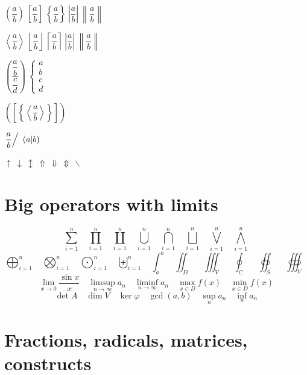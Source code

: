 \documentclass{article}
\begin{document}
$\left( \dfrac{a}{b} \right)\ \left[ \dfrac{a}{b} \right]\ \left\{ \dfrac{a}{b} \right\}\ \left| \dfrac{a}{b} \right|\ \left\| \dfrac{a}{b} \right\|$\par
$\left\langle \dfrac{a}{b} \right\rangle\ \left\lfloor \dfrac{a}{b} \right\rfloor\ \left\lceil \dfrac{a}{b} \right\rceil\ \left\lvert \dfrac{a}{b} \right\rvert\ \left\lVert \dfrac{a}{b} \right\rVert$\par
$\left( \dfrac{\dfrac{a}{b}}{\dfrac{c}{d}} \right)\ \left\{ \begin{array}{c} a \\ b \\ c \\ d \end{array} \right.$\par
$\left( \left[ \left\{ \left\langle \dfrac{a}{b} \right\rangle \right\} \right] \right)$\par
$\left. \dfrac{a}{b} \right/\ \left( a \middle| b \right)$\par
$\uparrow\ \downarrow\ \updownarrow\ \Uparrow\ \Downarrow\ \Updownarrow\ \backslash$\par

\section*{Big operators with limits}

\[
  \sum_{i=1}^{n}\quad \prod_{i=1}^{n}\quad \coprod_{i=1}^{n}\quad
  \bigcup_{i=1}^{n}\quad \bigcap_{i=1}^{n}\quad \bigsqcup_{i=1}^{n}\quad
  \bigvee_{i=1}^{n}\quad \bigwedge_{i=1}^{n}
\]
\[
  \bigoplus_{i=1}^{n}\quad \bigotimes_{i=1}^{n}\quad \bigodot_{i=1}^{n}\quad
  \biguplus_{i=1}^{n}\quad \int_{a}^{b}\quad \iint_{D}\quad \iiint_{V}\quad
  \oint_{C}\quad \oiint_{S}\quad \oiiint_{V}
\]
\[
  \lim_{x \to 0} \frac{\sin x}{x}\quad \limsup_{n\to\infty} a_n\quad
  \liminf_{n\to\infty} a_n\quad \max_{x\in D} f(x)\quad \min_{x\in D} f(x)
\]
\[
  \det A\quad \dim V\quad \ker \varphi\quad \gcd(a,b)\quad \sup_{n} a_n\quad \inf_{n} a_n
\]

\section*{Fractions, radicals, matrices, constructs}
\end{document}
